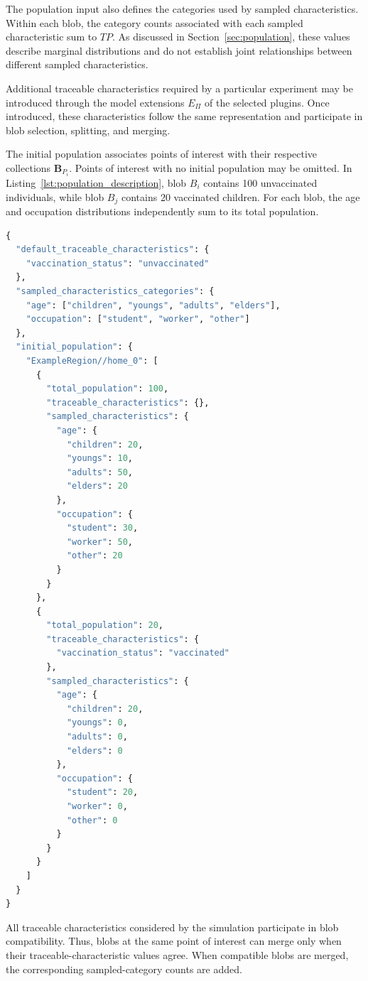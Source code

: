 The population input also defines the categories used by sampled characteristics. Within each blob, the category counts associated with each sampled characteristic sum to $TP$. As discussed in Section~\ref{sec:population}, these values describe marginal distributions and do not establish joint relationships between different sampled characteristics. 

Additional traceable characteristics required by a particular experiment may be introduced through the model extensions $E_{\Pi}$ of the selected plugins. Once introduced, these characteristics follow the same representation and participate in blob selection, splitting, and merging. 

The initial population associates points of interest with their respective collections $\bm{B}_{P_i}$. Points of interest with no initial population may be omitted. In Listing~\ref{lst:population_description}, blob $B_i$ contains 100 unvaccinated individuals, while blob $B_j$ contains 20 vaccinated children. For each blob, the age and occupation distributions independently sum to its total population.

\begin{lstlisting}[language={Python},
caption={Example of a population input file.},
captionpos=b, label={lst:population_description}, basicstyle=\scriptsize]
{
  "default_traceable_characteristics": {
    "vaccination_status": "unvaccinated"
  },
  "sampled_characteristics_categories": {
    "age": ["children", "youngs", "adults", "elders"],
    "occupation": ["student", "worker", "other"]
  },
  "initial_population": {
    "ExampleRegion//home_0": [
      {
        "total_population": 100,
        "traceable_characteristics": {},
        "sampled_characteristics": {
          "age": {
            "children": 20,
            "youngs": 10,
            "adults": 50,
            "elders": 20
          },
          "occupation": {
            "student": 30,
            "worker": 50,
            "other": 20
          }
        }
      },
      {
        "total_population": 20,
        "traceable_characteristics": {
          "vaccination_status": "vaccinated"
        },
        "sampled_characteristics": {
          "age": {
            "children": 20,
            "youngs": 0,
            "adults": 0,
            "elders": 0
          },
          "occupation": {
            "student": 20,
            "worker": 0,
            "other": 0
          }
        }
      }
    ]
  }
}
\end{lstlisting}

All traceable characteristics considered by the simulation participate in blob compatibility. Thus, blobs at the same point of interest can merge only when their traceable-characteristic values agree. When compatible blobs are merged, the corresponding sampled-category counts are added.


